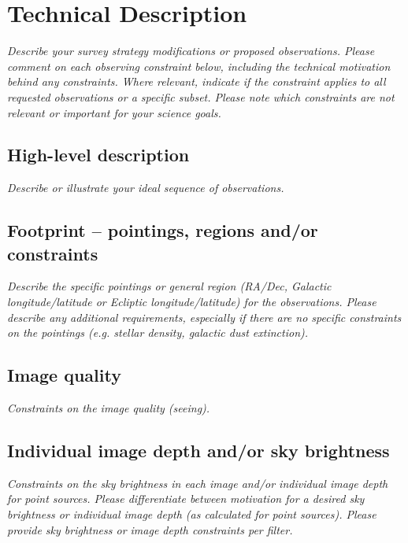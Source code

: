 \documentclass[11pt]{article}
\begin{document}
\section{Technical Description}
\begin{footnotesize}
{\it Describe your survey strategy modifications or proposed observations. Please comment on each observing constraint
below, including the technical motivation behind any constraints. Where relevant, indicate
if the constraint applies to all requested observations or a specific subset. Please note which 
constraints are not relevant or important for your science goals.}
\end{footnotesize}

\subsection{High-level description}
\begin{footnotesize}
{\it Describe or illustrate your ideal sequence of observations.}
\end{footnotesize}

\vspace{.3in}

\subsection{Footprint -- pointings, regions and/or constraints}
\begin{footnotesize}{\it Describe the specific pointings or general region (RA/Dec, Galactic longitude/latitude or 
Ecliptic longitude/latitude) for the observations. Please describe any additional requirements, especially if there
are no specific constraints on the pointings (e.g. stellar density, galactic dust extinction).}
\end{footnotesize}

\subsection{Image quality}
\begin{footnotesize}{\it Constraints on the image quality (seeing).}\end{footnotesize}

\subsection{Individual image depth and/or sky brightness}
\begin{footnotesize}{\it Constraints on the sky brightness in each image and/or individual image depth for point sources.
Please differentiate between motivation for a desired sky brightness or individual image depth (as 
calculated for point sources). Please provide sky brightness or image depth constraints per filter.}
\end{footnotesize}
\end{document}
